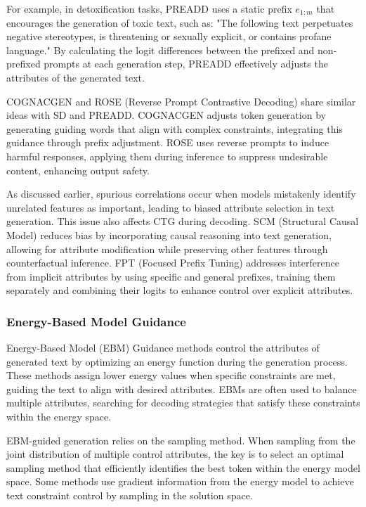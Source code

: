 \documentclass[acmsmall, screen]{acmart}
\begin{document}
For example, in detoxification tasks, PREADD uses a static prefix \( e_{1:m} \) that encourages the generation of toxic text, such as: "The following text perpetuates negative stereotypes, is threatening or sexually explicit, or contains profane language." By calculating the logit differences between the prefixed and non-prefixed prompts at each generation step, PREADD effectively adjusts the attributes of the generated text.

COGNACGEN \cite{chen_arxiv22_COGNACGEN} and ROSE (Reverse Prompt Contrastive Decoding) \cite{zhong_arxiv24_ROSE} share similar ideas with SD and PREADD. COGNACGEN adjusts token generation by generating guiding words that align with complex constraints, integrating this guidance through prefix adjustment. ROSE uses reverse prompts to induce harmful responses, applying them during inference to suppress undesirable content, enhancing output safety.

As discussed earlier, spurious correlations occur when models mistakenly identify unrelated features as important, leading to biased attribute selection in text generation. This issue also affects CTG during decoding.
SCM (Structural Causal Model) \cite{zhiting_nips21_SCM} reduces bias by incorporating causal reasoning into text generation, allowing for attribute modification while preserving other features through counterfactual inference. FPT (Focused Prefix Tuning) \cite{ma_acl23_FPT} addresses interference from implicit attributes by using specific and general prefixes, training them separately and combining their logits to enhance control over explicit attributes.

\subsubsection{\textbf{Energy-Based Model Guidance}}
Energy-Based Model (EBM) Guidance methods control the attributes of generated text by optimizing an energy function during the generation process. These methods assign lower energy values when specific constraints are met, guiding the text to align with desired attributes. EBMs are often used to balance multiple attributes, searching for decoding strategies that satisfy these constraints within the energy space.

EBM-guided generation relies on the sampling method. When sampling from the joint distribution of multiple control attributes, the key is to select an optimal sampling method that efficiently identifies the best token within the energy model space. Some methods use gradient information from the energy model to achieve text constraint control by sampling in the solution space.
\end{document}
